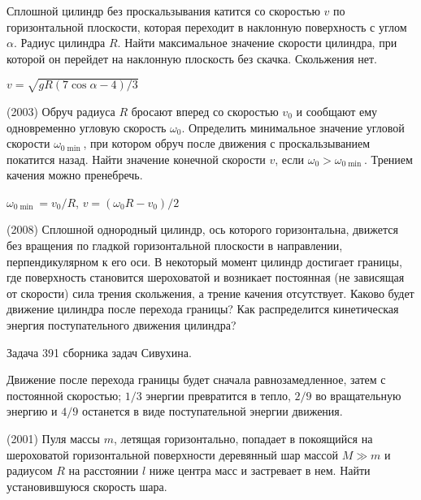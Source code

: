 \begin{ex}
Сплошной цилиндр без проскальзывания катится со скоростью $v$ по горизонтальной плоскости, которая переходит в наклонную поверхность с углом $\alpha$. Радиус цилиндра $R$. Найти максимальное значение скорости цилиндра, при которой он перейдет на наклонную плоскость без скачка. Скольжения нет.
\begin{ans}
$v=\sqrt{gR(7\cos \alpha - 4)/3}$
\end{ans}
\end{ex}

\begin{ex}
(2003) Обруч радиуса $R$ бросают вперед со скоростью $v_0$ и сообщают ему одновременно угловую скорость $\omega_0$. 
Определить минимальное значение угловой скорости  $\omega_{0 \min}$, при котором обруч после движения с проскальзыванием покатится назад. 
Найти значение конечной скорости $v$, если $\omega_0 > \omega_{0 \min} $. Трением качения можно пренебречь.
\begin{ans}
$\omega_{0 \min} = v_0/R$, $v= (\omega_0R - v_0)/2$
\end{ans}
\end{ex}

\begin{ex}
(2008) Сплошной однородный цилиндр, ось которого горизонтальна, движется без вращения по гладкой горизонтальной плоскости в направлении, перпендикулярном к его оси. В некоторый момент цилиндр достигает границы, где поверхность становится шероховатой и возникает постоянная (не зависящая от скорости) сила трения скольжения, а трение качения отсутствует. Каково будет движение цилиндра после перехода границы? Как распределится кинетическая энергия поступательного движения цилиндра?
\begin{sol}
Задача 391 сборника задач Сивухина.
\end{sol}
\begin{ans}
Движение после перехода границы будет сначала равнозамедленное, затем с постоянной скоростью; $1/3$ энергии превратится в тепло, $2/9$ во вращательную энергию и $4/9$ останется в виде поступательной энергии движения.
\end{ans}
\end{ex}

\begin{ex}
(2001) Пуля массы $m$, летящая горизонтально, попадает в покоящийся на шероховатой горизонтальной поверхности деревянный шар массой $M \gg m$  и радиусом $R$ на расстоянии $l$ ниже центра масс и застревает в нем. Найти установившуюся скорость шара.
\begin{ans}

\end{ans}
\end{ex}

